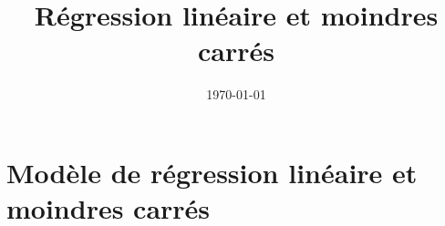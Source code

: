 

\title{Régression linéaire et moindres carrés}
\date{\today}



 

\maketitle

\section{Modèle de régression linéaire et moindres carrés}

